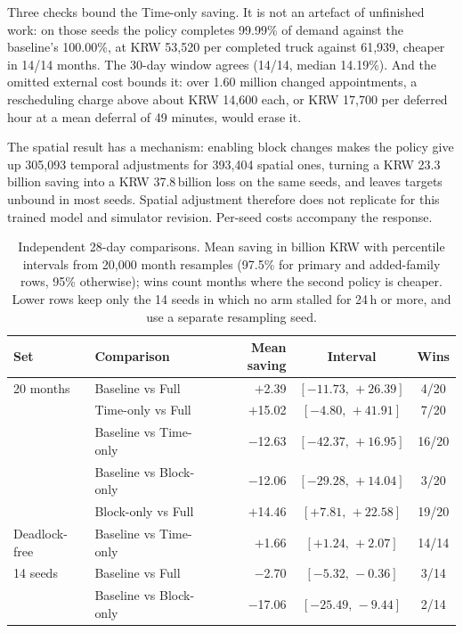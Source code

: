 \documentclass[a4paper]{llncs}
\begin{document}
Three checks bound the Time-only saving. It is not an artefact of
unfinished work: on those seeds the policy completes 99.99\% of demand
against the baseline's 100.00\%, at KRW 53{,}520 per completed truck
against 61{,}939, cheaper in 14/14 months. The 30-day window agrees
(14/14, median 14.19\%). And the omitted external cost bounds it: over
1.60 million changed appointments, a rescheduling charge above about
KRW 14{,}600 each, or KRW 17{,}700 per deferred hour at a mean deferral
of 49 minutes, would erase it.

The spatial result has a mechanism: enabling block changes makes the
policy give up 305{,}093 temporal adjustments for 393{,}404 spatial
ones, turning a KRW 23.3\,billion saving into a KRW 37.8\,billion loss
on the same seeds, and leaves targets unbound in most seeds. Spatial
adjustment therefore does not replicate for this trained model and
simulator revision. Per-seed costs accompany the response.
\begin{table}[htbp]
\centering
\caption{Independent 28-day comparisons. Mean saving in billion KRW with
percentile intervals from 20{,}000 month resamples (97.5\% for primary
and added-family rows, 95\% otherwise); wins count months where the
second policy is cheaper. Lower rows keep only the 14 seeds in which no
arm stalled for 24\,h or more, and use a separate resampling seed.}
\label{tab:independent}
\small
\setlength{\tabcolsep}{4pt}
\begin{tabular}{@{}llrcc@{}}
\toprule
Set & Comparison & Mean saving & Interval & Wins \\
\midrule
20 months & Baseline vs Full & $+$2.39 & $[-11.73,\,+26.39]$ & 4/20 \\
 & Time-only vs Full & $+$15.02 & $[-4.80,\,+41.91]$ & 7/20 \\
 & Baseline vs Time-only & $-$12.63 & $[-42.37,\,+16.95]$ & 16/20 \\
 & Baseline vs Block-only & $-$12.06 & $[-29.28,\,+14.04]$ & 3/20 \\
 & Block-only vs Full & $+$14.46 & $[+7.81,\,+22.58]$ & 19/20 \\
\midrule
Deadlock-free & Baseline vs Time-only & $+$1.66 & $[+1.24,\,+2.07]$ & 14/14 \\
14 seeds & Baseline vs Full & $-$2.70 & $[-5.32,\,-0.36]$ & 3/14 \\
 & Baseline vs Block-only & $-$17.06 & $[-25.49,\,-9.44]$ & 2/14 \\
\bottomrule
\end{tabular}
\end{table}
\end{document}
